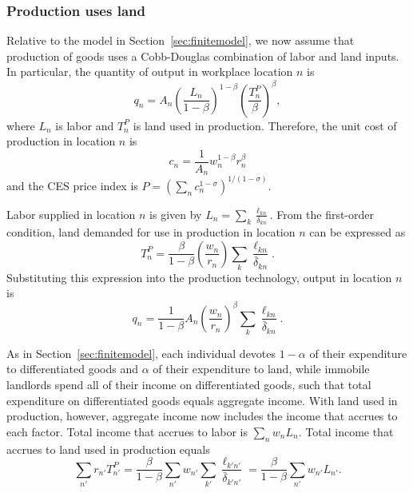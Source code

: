 \documentclass[11pt]{article}
\theoremstyle{definition}
\begin{document}
\subsubsection{Production uses land}

Relative to the model in Section~\ref{sec:finitemodel},
we now assume that production of goods uses a Cobb-Douglas combination of labor and land inputs.
In particular, the quantity of output in workplace location $n$ is
\begin{equation*}
    q_n = A_n \left(\frac{L_n}{1-\beta}\right)^{1-\beta} \left(\frac{T_n^P}{\beta}\right)^{\beta} 
,\end{equation*}
where $L_n$ is labor and $T_n^P$ is land used in production.
Therefore, the unit cost of production in location $n$ is
\begin{equation*}
    c_n = \frac{1}{A_n} w_n^{1-\beta} r_n^{\beta}
\end{equation*}
and the CES price index is
$P = \left(\sum_n c_n^{1-\sigma}\right)^{1/(1-\sigma)}$.

Labor supplied in location $n$ is given by $L_n = \sum_k \frac{\ell_{kn}}{\delta_{kn}}$.
From the first-order condition, land demanded for use in production in location $n$ can be expressed as
\begin{equation*}
    T_n^P = \frac{\beta}{1-\beta} \left(\frac{w_n}{r_n}\right) \sum_k \frac{\ell_{kn}}{\bar{\delta}_{kn}}.
\end{equation*}
Substituting this expression into the production technology,
output in location $n$ is
\begin{equation*}
    q_n = \frac{1}{1-\beta} A_n \left(\frac{w_n}{r_n}\right)^{\beta} \sum_k \frac{\ell_{kn}}{\bar{\delta}_{kn}}.
\end{equation*}

As in Section~\ref{sec:finitemodel},
each individual devotes $1{-}\alpha$ of their expenditure to differentiated goods
and $\alpha$ of their expenditure to land,
while immobile landlords spend all of their income on differentiated goods,
such that total expenditure on differentiated goods equals aggregate income.
With land used in production, however, aggregate income now includes the income
that accrues to each factor.
Total income that accrues to labor is $\sum_{n} w_{n} L_{n}$.
Total income that accrues to land used in production equals
\begin{equation*}
    \sum_{n'} r_{n'} T_{n'}^P
    =
    \frac{\beta}{1-\beta} \sum_{n'} w_{n'} \sum_{k'} \frac{\ell_{k'n'}}{\bar{\delta}_{k'n'}}
    =
    \frac{\beta}{1-\beta} \sum_{n'} w_{n'} L_{n'}
    .
\end{equation*}
\end{document}
